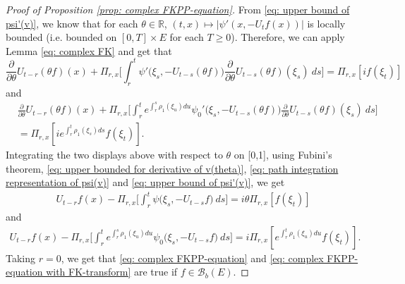 \documentclass[12pt,a4paper]{amsart}
\theoremstyle{plain}
\theoremstyle{definition}
\numberwithin{equation}{section}
\begin{document}
\begin{proof}[Proof of Proposition \ref{prop: complex FKPP-equation}]
  From \eqref{eq: upper bound of psi'(v)}, we know that for each $\theta\in \mathbb R$, $(t,x) \mapsto |\psi'(x,-U_tf(x))|$ is locally bounded (i.e. bounded on $[0,T]\times E$ for each $T \geq 0$).
  Therefore, we can apply Lemma \ref{eq: complex FK} and get that
  \[
    \frac{\partial}{\partial \theta} U_{t-r}(\theta f)(x) + \Pi_{r,x} \Big[\int_r^t \psi'\big(\xi_s,- U_{t-s}(\theta f)\big)\frac{\partial}{\partial \theta} U_{t-s}(\theta f)(\xi_s)~ds\Big]
    = \Pi_{r,x} [i f(\xi_t)]
  \]
  and
  \begin{align}
    & \frac{\partial}{\partial \theta} U_{t-r}(\theta f)(x) + \Pi_{r,x} \Big[\int_r^t e^{\int_r^s \rho_1(\xi_u)du}\psi_0'\big(\xi_s,- U_{t-s}(\theta f)\big)\frac{\partial}{\partial \theta} U_{t-s}(\theta f)(\xi_s)~ds\Big]\\
    & = \Pi_{r,x} [i e^{\int_r^t \rho_1(\xi_s)ds}f(\xi_t)].
  \end{align}
  Integrating the two displays above with respect to $\theta$  on [0,1], using
  Fubini's theorem, \eqref{eq: upper bounded for derivative of v(theta)}, \eqref{eq: path integration representation of psi(v)} and \eqref{eq: upper bound of psi'(v)}, we get
  \begin{align}
    U_{t-r}f(x) - \Pi_{r,x} \Big[\int_r^t \psi\big(\xi_s,-U_{t-s}f\big) ~ds\Big]
    = i \theta \Pi_{r,x} [f(\xi_t)]
  \end{align}
  and
  \begin{align}
    U_{t-r}f(x) - \Pi_{r,x} \Big[\int_r^t e^{\int_r^s \rho_1(\xi_u)du} \psi_0\big(\xi_s,- U_{t-s}f\big) ~ds\Big]
    = i \Pi_{r,x} [e^{\int_r^t\rho_1(\xi_u)du}f(\xi_t)].
  \end{align}
  Taking $r = 0$, we get that \eqref{eq: complex FKPP-equation} and \eqref{eq: complex FKPP-equation with FK-transform} are true if $f\in \mathcal B_b(E)$.


\end{proof}
\end{document}
